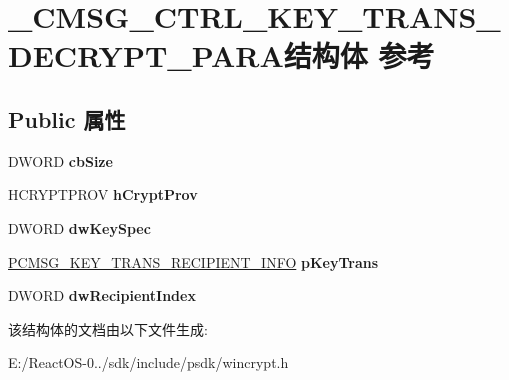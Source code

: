 \hypertarget{struct___c_m_s_g___c_t_r_l___k_e_y___t_r_a_n_s___d_e_c_r_y_p_t___p_a_r_a}{}\section{\+\_\+\+C\+M\+S\+G\+\_\+\+C\+T\+R\+L\+\_\+\+K\+E\+Y\+\_\+\+T\+R\+A\+N\+S\+\_\+\+D\+E\+C\+R\+Y\+P\+T\+\_\+\+P\+A\+R\+A结构体 参考}
\label{struct___c_m_s_g___c_t_r_l___k_e_y___t_r_a_n_s___d_e_c_r_y_p_t___p_a_r_a}
\subsection*{Public 属性}
\begin{DoxyCompactItemize}
\item 
\mbox{\label{struct___c_m_s_g___c_t_r_l___k_e_y___t_r_a_n_s___d_e_c_r_y_p_t___p_a_r_a_a06110aa153b87234ad407c18e80ee6a4}} 
D\+W\+O\+RD {\bfseries cb\+Size}
\item 
\mbox{\label{struct___c_m_s_g___c_t_r_l___k_e_y___t_r_a_n_s___d_e_c_r_y_p_t___p_a_r_a_a5d4c564481b0142ca210258b9ccb1e92}} 
H\+C\+R\+Y\+P\+T\+P\+R\+OV {\bfseries h\+Crypt\+Prov}
\item 
\mbox{\label{struct___c_m_s_g___c_t_r_l___k_e_y___t_r_a_n_s___d_e_c_r_y_p_t___p_a_r_a_a417b44c37543a98c152846e5af01d158}} 
D\+W\+O\+RD {\bfseries dw\+Key\+Spec}
\item 
\mbox{\label{struct___c_m_s_g___c_t_r_l___k_e_y___t_r_a_n_s___d_e_c_r_y_p_t___p_a_r_a_acf0561f6e43c896b8f564c7a7b6a9ccc}} 
\hyperlink{struct___c_m_s_g___k_e_y___t_r_a_n_s___r_e_c_i_p_i_e_n_t___i_n_f_o}{P\+C\+M\+S\+G\+\_\+\+K\+E\+Y\+\_\+\+T\+R\+A\+N\+S\+\_\+\+R\+E\+C\+I\+P\+I\+E\+N\+T\+\_\+\+I\+N\+FO} {\bfseries p\+Key\+Trans}
\item 
\mbox{\label{struct___c_m_s_g___c_t_r_l___k_e_y___t_r_a_n_s___d_e_c_r_y_p_t___p_a_r_a_ad6f08c3f81b56bebdba82263700391e6}} 
D\+W\+O\+RD {\bfseries dw\+Recipient\+Index}
\end{DoxyCompactItemize}


该结构体的文档由以下文件生成\+:\begin{DoxyCompactItemize}
\item 
E\+:/\+React\+O\+S-\/0../sdk/include/psdk/wincrypt.\+h\end{DoxyCompactItemize}
